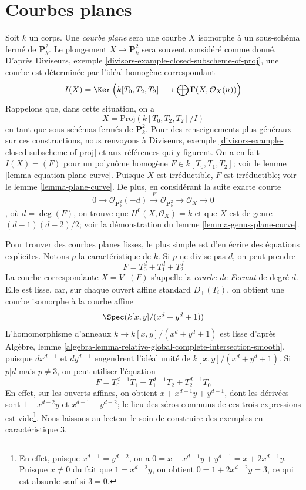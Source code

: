 \section{Courbes planes}
\label{section-plane-curves}

\noindent
Soit $k$ un corps. Une {\it courbe plane} sera une courbe $X$ isomorphe à un sous-schéma fermé de $\mathbf{P}^2_k$. Le plongement $X \to \mathbf{P}^2_k$ sera souvent considéré comme donné. D'après Diviseurs, exemple \ref{divisors-example-closed-subscheme-of-proj}, une courbe est déterminée par l'idéal homogène correspondant $$
I(X) =
\Ker\left(
k[T_0, T_2, T_2] \longrightarrow \bigoplus \Gamma(X, \mathcal{O}_X(n))
\right)
$$ Rappelons que, dans cette situation, on a $$
X = \text{Proj}(k[T_0, T_2, T_2]/I)
$$ en tant que sous-schémas fermés de $\mathbf{P}^2_k$. Pour des renseignements plus généraux sur ces constructions, nous renvoyons à Diviseurs, exemple \ref{divisors-example-closed-subscheme-of-proj} et aux références qui y figurent. On a en fait $I(X) = (F)$ pour un polynôme homogène $F \in k[T_0, T_1, T_2]$; voir le lemme \ref{lemma-equation-plane-curve}. Puisque $X$ est irréductible, $F$ est irréductible; voir le lemme \ref{lemma-plane-curve}. De plus, en considérant la suite exacte courte $$
0 \to \mathcal{O}_{\mathbf{P}^2_k}(-d) \xrightarrow{F}
\mathcal{O}_{\mathbf{P}^2_k} \to \mathcal{O}_X \to 0
$$, où $d = \deg(F)$, on trouve que $H^0(X, \mathcal{O}_X) = k$ et que $X$ est de genre $(d - 1)(d - 2)/2$; voir la démonstration du lemme \ref{lemma-genus-plane-curve}.

\medskip\noindent
Pour trouver des courbes planes lisses, le plus simple est d'en écrire des équations explicites. Notons $p$ la caractéristique de $k$. Si $p$ ne divise pas $d$, on peut prendre $$
F = T_0^d + T_1^d + T_2^d
$$ La courbe correspondante $X = V_+(F)$ s'appelle la {\it courbe de Fermat} de degré $d$. Elle est lisse, car, sur chaque ouvert affine standard $D_+(T_i)$, on obtient une courbe isomorphe à la courbe affine $$
\Spec(k[x, y]/(x^d + y^d + 1))
$$ L'homomorphisme d'anneaux $k \to k[x, y]/(x^d + y^d + 1)$ est lisse d'après Algèbre, lemme \ref{algebra-lemma-relative-global-complete-intersection-smooth}, puisque $d x^{d - 1}$ et $d y^{d - 1}$ engendrent l'idéal unité de $k[x, y]/(x^d + y^d + 1)$. Si $p | d$ mais $p \not = 3$, on peut utiliser l'équation $$
F = T_0^{d - 1}T_1 + T_1^{d - 1}T_2 + T_2^{d - 1}T_0
$$ En effet, sur les ouverts affines, on obtient $x + x^{d - 1}y + y^{d - 1}$, dont les dérivées sont $1 - x^{d - 2}y$ et $x^{d - 1} - y^{d - 2}$; le lieu des zéros communs de ces trois expressions est vide\footnote{En effet, puisque $x^{d - 1} = y^{d - 2}$, on a $0 = x + x^{d - 1}y + y^{d - 1} =
x + 2 x^{d - 1} y$. Puisque $x \not = 0$ du fait que $1 = x^{d - 2}y$, on obtient $0 = 1 + 2x^{d - 2}y = 3$, ce qui est absurde sauf si $3 = 0$.}. Nous laissons au lecteur le soin de construire des exemples en caractéristique $3$.

